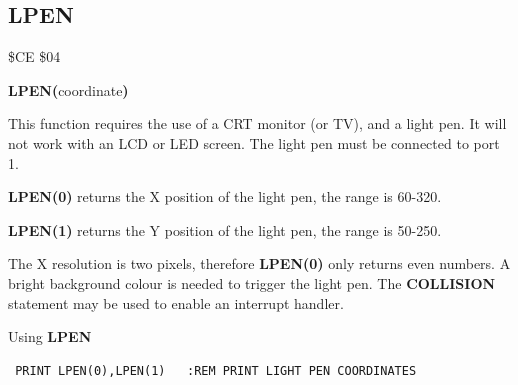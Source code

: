 \subsection{LPEN}
\begin{description}[leftmargin=2cm,style=nextline]
\item [Token:] \$CE \$04
\item [Format:] {\bf LPEN(}coordinate{\bf)}
\item [Usage:] This function requires the use of a
               CRT monitor (or TV), and a light pen.
               It will not work with an LCD or LED screen.
               The light pen must be connected to port 1.

               {\bf LPEN(0)} returns the X position of the light pen,
               the range is 60-320.

               {\bf LPEN(1)} returns the Y position of the light pen,
               the range is 50-250.

\item [Remarks:] The X resolution is two pixels, therefore {\bf LPEN(0)} only
                 returns even numbers.
                 A bright background colour is needed to trigger
                 the light pen. The {\bf COLLISION} statement may
                 be used to enable an interrupt handler.

\item [Example:] Using {\bf LPEN}
\begin{tcolorbox}[colback=black,coltext=white]
\verbatimfont{\codefont}
\begin{verbatim}
 PRINT LPEN(0),LPEN(1)   :REM PRINT LIGHT PEN COORDINATES
\end{verbatim}
\end{tcolorbox}
\end{description}


\newpage
